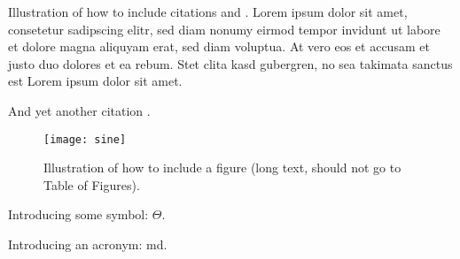 Illustration of how to include citations \cite{Meert2011PhD} and \cite{VandenBroeck2011IJCAI}. Lorem ipsum dolor sit amet, consetetur sadipscing elitr, sed diam nonumy eirmod tempor invidunt ut labore et dolore magna aliquyam erat, sed diam voluptua. At vero eos et accusam et justo duo dolores et ea rebum. Stet clita kasd gubergren, no sea takimata sanctus est Lorem ipsum dolor sit amet.

And yet another citation \cite{FrRo2010Diffusion}.

\begin{figure}[th!]
  \centering
  \medskip
  \texttt{[image: sine]}
  \caption[Short caption for Table of Figures]{Illustration of how to
  include a figure (long text, should not go to Table of Figures).}
  \label{fig:sine}
\end{figure}
Introducing some symbol: $\Theta$.

Introducing an acronym: \gls{md}.

\cleardoublepage

